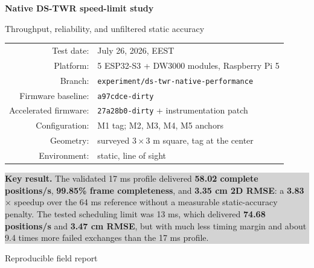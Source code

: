 \documentclass[11pt,a4paper]{article}
\newcommand{\dstwr}{DS-TWR}
\begin{document}

\begin{titlepage}
  \centering
  \vspace*{17mm}
  {\Huge\bfseries Native \dstwr{} speed-limit study\par}
  \vspace{4mm}
  {\Large Throughput, reliability, and unfiltered static accuracy\par}
  \vspace{16mm}

  \begin{tabular}{rl}
    Test date: & July 26, 2026, EEST\\
    Platform: & 5 ESP32-S3 + DW3000 modules, Raspberry Pi 5\\
    Branch: & \texttt{experiment/ds-twr-native-performance}\\
    Firmware baseline: & \texttt{a97cdce-dirty}\\
    Accelerated firmware: & \texttt{27a28b0-dirty} + instrumentation patch\\
    Configuration: & M1 tag; M2, M3, M4, M5 anchors\\
    Geometry: & surveyed $3\times3$ m square, tag at the center\\
    Environment: & static, line of sight\\
  \end{tabular}

  \vfill
  \colorbox{lightgray}{%
    \begin{minipage}{0.88\textwidth}
      \vspace{3mm}
      \textbf{Key result.}
      The validated 17 ms profile delivered \textbf{58.02 complete
      positions/s}, \textbf{99.85\% frame completeness}, and
      \textbf{3.35 cm 2D RMSE}: a \textbf{3.83$\times$} speedup over the
      64 ms reference without a measurable static-accuracy penalty.
      The tested scheduling limit was 13 ms, which delivered
      \textbf{74.68 positions/s} and \textbf{3.47 cm RMSE}, but with much
      less timing margin and about 9.4 times more failed exchanges than the
      17 ms profile.
      \vspace{3mm}
    \end{minipage}}
  \vfill
  {\large Reproducible field report\par}
  \vspace{5mm}
\end{titlepage}

\tableofcontents
\clearpage
{}
\end{document}
